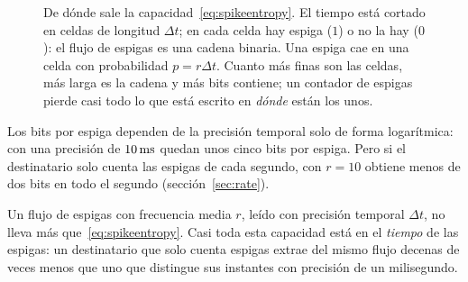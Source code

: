\begin{figure}[t]
\centering
{}
\caption{De dónde sale la capacidad~\eqref{eq:spikeentropy}. El tiempo está cortado en celdas de longitud $\Delta t$; en cada celda hay espiga ($1$) o no la hay ($0$): el flujo de espigas es una cadena binaria. Una espiga cae en una celda con probabilidad $p=r\Delta t$. Cuanto más finas son las celdas, más larga es la cadena y más bits contiene; un contador de espigas pierde casi todo lo que está escrito en \emph{dónde} están los unos.}
\label{fig:cells}
\end{figure}

Los bits por espiga dependen de la precisión temporal solo de forma logarítmica: con una precisión de $10\,\text{ms}$ quedan unos cinco bits por espiga. Pero si el destinatario solo cuenta las espigas de cada segundo, con $r=10$ obtiene menos de dos bits en todo el segundo (sección~\ref{sec:rate}).

\begin{keyblock}
\begin{proposition}
\label{prop:capacity}
Un flujo de espigas con frecuencia media $r$, leído con precisión temporal $\Delta t$, no lleva más que~\eqref{eq:spikeentropy}. Casi toda esta capacidad está en el \emph{tiempo} de las espigas: un destinatario que solo cuenta espigas extrae del mismo flujo decenas de veces menos que uno que distingue sus instantes con precisión de un milisegundo.
\end{proposition}
\end{keyblock}

